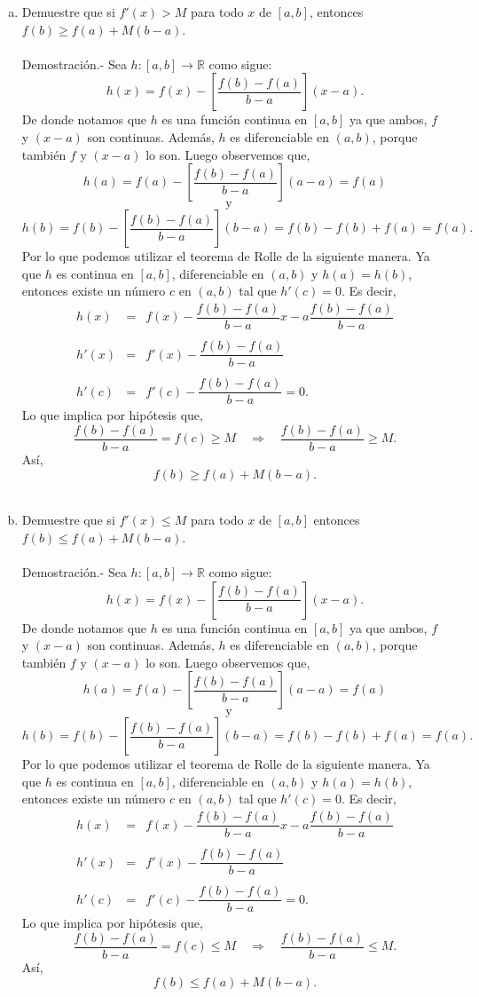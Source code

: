 \begin{enumerate}[\bfseries 1.]
\begin{enumerate}[(a)]
	    \item Demuestre que si $f'(x)>M$ para todo $x$ de $[a,b]$, entonces $f(b)\geq f(a)+M(b-a)$.\\\\
		Demostración.-\; Sea $h:[a,b]\to \mathbb{R}$ como sigue:
		$$h(x)=f(x)-\left[\dfrac{f(b)-f(a)}{b-a}\right](x-a).$$
		De donde notamos que $h$ es una función continua en $[a,b]$ ya que ambos, $f$ y $(x-a)$ son continuas. Además, $h$ es diferenciable en $(a,b)$, porque también $f$ y $(x-a)$ lo son. Luego observemos que,
		$$h(a)=f(a)-\left[\dfrac{f(b)-f(a)}{b-a}\right](a-a)=f(a)$$ 
		$$\mbox{y}\quad$$
		$$h(b)=f(b)-\left[\dfrac{f(b)-f(a)}{b-a}\right](b-a)=f(b)-f(b)+f(a)=f(a).$$
		Por lo que podemos utilizar el teorema de Rolle de la siguiente manera. Ya que $h$ es continua en $[a,b]$, diferenciable en $(a,b)$ y $h(a)=h(b)$, entonces existe un número $c$ en $(a,b)$ tal que $h'(c)=0$. Es decir,
		$$\begin{array}{rcl}
		    h(x)&=&f(x)-\dfrac{f(b)-f(a)}{b-a}x-a\dfrac{f(b)-f(a)}{b-a}\\\\
		    h'(x)&=&f'(x)-\dfrac{f(b)-f(a)}{b-a}\\\\
		    h'(c)&=&f'(c)-\dfrac{f(b)-f(a)}{b-a}=0.
		\end{array}$$
		Lo que implica por hipótesis que,
		$$\dfrac{f(b)-f(a)}{b-a}=f(c)\geq M \quad \Rightarrow \quad \dfrac{f(b)-f(a)}{b-a}\geq M.$$
		Así,
		$$f(b)\geq f(a)+M(b-a).$$\\

	    \item Demuestre que si $f'(x)\leq M$ para todo $x$ de $[a,b]$ entonces $f(b)\leq f(a)+M(b-a)$.\\\\
		Demostración.-\; Sea $h:[a,b]\to \mathbb{R}$ como sigue:
		$$h(x)=f(x)-\left[\dfrac{f(b)-f(a)}{b-a}\right](x-a).$$
		De donde notamos que $h$ es una función continua en $[a,b]$ ya que ambos, $f$ y $(x-a)$ son continuas. Además, $h$ es diferenciable en $(a,b)$, porque también $f$ y $(x-a)$ lo son. Luego observemos que,
		$$h(a)=f(a)-\left[\dfrac{f(b)-f(a)}{b-a}\right](a-a)=f(a)$$ 
		$$\mbox{y}\quad$$
		$$h(b)=f(b)-\left[\dfrac{f(b)-f(a)}{b-a}\right](b-a)=f(b)-f(b)+f(a)=f(a).$$
		Por lo que podemos utilizar el teorema de Rolle de la siguiente manera. Ya que $h$ es continua en $[a,b]$, diferenciable en $(a,b)$ y $h(a)=h(b)$, entonces existe un número $c$ en $(a,b)$ tal que $h'(c)=0$. Es decir,
		$$\begin{array}{rcl}
		    h(x)&=&f(x)-\dfrac{f(b)-f(a)}{b-a}x-a\dfrac{f(b)-f(a)}{b-a}\\\\
		    h'(x)&=&f'(x)-\dfrac{f(b)-f(a)}{b-a}\\\\
		    h'(c)&=&f'(c)-\dfrac{f(b)-f(a)}{b-a}=0.
		\end{array}$$
		Lo que implica por hipótesis que,
		$$\dfrac{f(b)-f(a)}{b-a}=f(c)\leq M \quad \Rightarrow \quad \dfrac{f(b)-f(a)}{b-a}\leq M.$$
		Así,
		$$f(b)\leq f(a)+M(b-a).$$\\


\end{enumerate}
\end{enumerate}
